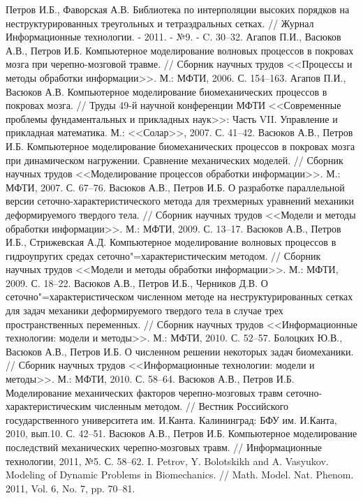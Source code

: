 \begin{thebibliography}{99}
 Петров И.Б., Фаворская А.В. Библиотека по интерполяции высоких порядков на неструктурированных треугольных и тетраэдральных сетках. // Журнал Информационные технологии. - 2011. - №9. - C. 30--32.
 Агапов П.И., Васюков А.В., Петров И.Б. Компьютерное моделирование волновых процессов в покровах мозга при черепно-мозговой травме. // Сборник научных трудов <<Процессы и методы обработки информации>>. М.: МФТИ, 2006. С. 154--163.
 Агапов П.И., Васюков А.В. Компьютерное моделирование биомеханических процессов в покровах мозга. // Труды 49-й научной конференции МФТИ <<Современные проблемы фундаментальных и прикладных наук>>: Часть VII. Управление и прикладная математика. М.: <<Солар>>, 2007. С. 41--42.
 Васюков А.В., Петров И.Б. Компьютерное моделирование биомеханических процессов в покровах мозга при динамическом нагружении. Сравнение механических моделей. // Сборник научных трудов <<Моделирование процессов обработки информации>>. М.: МФТИ, 2007. С. 67--76.
 Васюков А.В., Петров И.Б. О разработке параллельной версии сеточно-характеристического метода для трехмерных уравнений механики деформируемого твердого тела. // Сборник научных трудов <<Модели и методы обработки информации>>. М.: МФТИ, 2009. С. 13--17.
 Васюков А.В., Петров И.Б., Стрижевская А.Д. Компьютерное моделирование волновых процессов в гидроупругих средах сеточно"=характеристическим методом. // Сборник научных трудов <<Модели и методы обработки информации>>. М.: МФТИ, 2009. С. 18--22.
 Васюков А.В., Петров И.Б., Черников Д.В. О сеточно"=характеристическом численном методе на неструктурированных сетках для задач механики деформируемого твердого тела в случае трех пространственных переменных. // Сборник научных трудов <<Информационные технологии: модели и методы>>. М.: МФТИ, 2010. С. 52--57.
 Болоцких Ю.В., Васюков А.В., Петров И.Б. О численном решении некоторых задач биомеханики. // Сборник научных трудов <<Информационные технологии: модели и методы>>. М.: МФТИ, 2010. С. 58--64.
 Васюков А.В., Петров И.Б. Моделирование механических факторов черепно-мозговых травм сеточно-характеристическим численным методом. // Вестник Российского государственного университета им. И.Канта. Калининград: БФУ им. И.Канта, 2010, вып.10. С. 42--51.
 Васюков А.В., Петров И.Б. Компьютерное моделирование последствий механических черепно-мозговых травм. // Информационные технологии, 2011, №5. С. 58--62.
 I. Petrov, Y. Bolotskikh and A. Vasyukov. Modeling of Dynamic Problems in Biomechanics. // Math. Model. Nat. Phenom. 2011, Vol. 6, No. 7, pp. 70--81.

\end{thebibliography}
